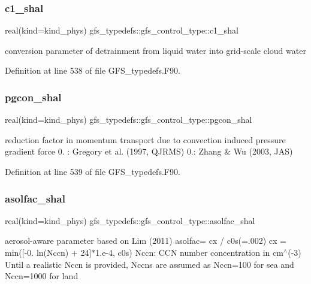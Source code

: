 \subsubsection{c1\+\_\+shal}
{\footnotesize\ttfamily real(kind=kind\+\_\+phys) gfs\+\_\+typedefs\+::gfs\+\_\+control\+\_\+type\+::c1\+\_\+shal}



conversion parameter of detrainment from liquid water into grid-\/scale cloud water 



Definition at line 538 of file G\+F\+S\+\_\+typedefs.\+F90.

\mbox{\label{structgfs__typedefs_1_1gfs__control__type_acdcbeba961429157d7ccf506434e8bad}} 
\subsubsection{pgcon\+\_\+shal}
{\footnotesize\ttfamily real(kind=kind\+\_\+phys) gfs\+\_\+typedefs\+::gfs\+\_\+control\+\_\+type\+::pgcon\+\_\+shal}



reduction factor in momentum transport due to convection induced pressure gradient force 0. \+: Gregory et al. (1997, Q\+J\+R\+MS) 0.\+: Zhang \& Wu (2003, J\+AS) 



Definition at line 539 of file G\+F\+S\+\_\+typedefs.\+F90.

\mbox{\label{structgfs__typedefs_1_1gfs__control__type_abc5d0b890d4cf185647af6c170d94a93}} 
\subsubsection{asolfac\+\_\+shal}
{\footnotesize\ttfamily real(kind=kind\+\_\+phys) gfs\+\_\+typedefs\+::gfs\+\_\+control\+\_\+type\+::asolfac\+\_\+shal}



aerosol-\/aware parameter based on Lim (2011) asolfac= cx / c0s(=.002) cx = min([-\/0. ln(\+Nccn) + 24]$\ast$1.e-\/4, c0s) Nccn\+: C\+CN number concentration in cm$^\wedge$(-\/3) Until a realistic Nccn is provided, Nccns are assumed as Nccn=100 for sea and Nccn=1000 for land 




